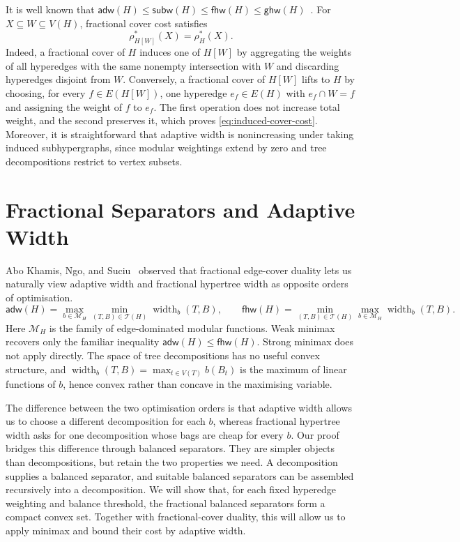 \documentclass[11pt,letterpaper]{article}
\theoremstyle{definition}
\theoremstyle{remark}
\newcommand{\ghw}{\mathsf{ghw}}
\newcommand{\fhw}{\mathsf{fhw}}
\newcommand{\adw}{\mathsf{adw}}
\newcommand{\subw}{\mathsf{subw}}
\providecommand{\adw}{\operatorname{adw}}
\providecommand{\subw}{\operatorname{subw}}
\providecommand{\fhw}{\operatorname{fhw}}
\begin{document}
It is well known that
$\adw(H)\le\subw(H)\le\fhw(H)\le\ghw(H)$~\cite{adw,Marx13,fhw}.
For $X\subseteq W\subseteq V(H)$, fractional cover cost satisfies
\begin{equation}
 \rho_{H[W]}^*(X)=\rho_H^*(X).
 \label{eq:induced-cover-cost}
\end{equation}
Indeed, a fractional cover of $H$ induces one of $H[W]$ by aggregating the
weights of all hyperedges with the same nonempty intersection with $W$ and
discarding hyperedges disjoint from $W$. Conversely, a fractional cover of
$H[W]$ lifts to $H$ by choosing, for every $f\in E(H[W])$, one hyperedge
$e_f\in E(H)$ with $e_f\cap W=f$ and assigning the weight of $f$ to $e_f$.
The first operation does not increase total weight, and the second preserves
it, which proves \eqref{eq:induced-cover-cost}.
Moreover, it is straightforward that adaptive width is nonincreasing under taking induced subhypergraphs, since modular
weightings extend by zero and tree decompositions restrict to vertex subsets.
\section{Fractional Separators and Adaptive Width}
\label{sec:separators}

Abo Khamis, Ngo, and Suciu~\cite{KhamisNgoSuciu2025PANDA} observed that fractional edge-cover duality lets us naturally view adaptive width and fractional hypertree
width as opposite orders of optimisation.
\[
 \adw(H)=\max_{b\in\mathcal M_H}\min_{(T,B)\in\mathcal T(H)}
                  \operatorname{width}_b(T,B),
 \qquad
 \fhw(H)=\min_{(T,B)\in\mathcal T(H)}\max_{b\in\mathcal M_H}
                  \operatorname{width}_b(T,B).
\]
Here $\mathcal M_H$ is the family of edge-dominated modular functions.
Weak minimax recovers only the familiar inequality
$\adw(H)\le\fhw(H)$.
Strong minimax does not apply directly. The space of tree decompositions has
no useful convex structure, and
$\operatorname{width}_b(T,B)=\max_{t\in V(T)}b(B_t)$ is the maximum of
linear functions of $b$, hence convex rather than concave in the
maximising variable.

The difference between the two optimisation orders is that adaptive
width allows us to choose a different decomposition for each $b$, whereas
fractional hypertree width asks for one decomposition whose bags are cheap
for every $b$. Our proof bridges this difference through balanced
separators. They are simpler objects than decompositions, but retain the
two properties we need. A decomposition supplies a balanced separator,
and suitable balanced separators can be assembled recursively into a
decomposition. We will show that, for each fixed hyperedge weighting and balance threshold, the fractional balanced separators form a compact convex set. Together with fractional-cover duality, this will allow us to apply minimax and bound their cost by adaptive width.
\end{document}
